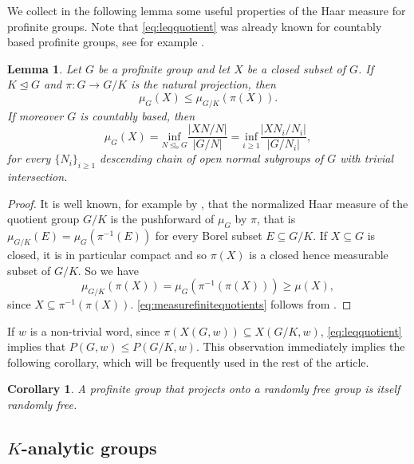 \documentclass[a4paper,10pt]{amsart}
\theoremstyle{plain}
\newtheorem{corollary}[thm]{Corollary}
\newtheorem{lemma}[thm]{Lemma}
\theoremstyle{definition}
\numberwithin{equation}{section}
\begin{document}
We collect in the following lemma some useful properties of the Haar measure for profinite groups. Note that \cref{eq:leqquotient} was already known for countably based profinite groups, see for example \cite[Lemma 11.1.1]{LS03}.

\begin{lemma}\label{quotient}
	   	Let $G$ be a profinite group and let $X$ be a closed subset of $G$. If $K\unlhd G$ and $\pi\colon G\to G/K$ is the natural projection, then \begin{equation}\label{eq:leqquotient}
	   		\mu_G(X)\leq\mu_{G/K}(\pi(X)).
	   	\end{equation}
	   	 If moreover $G$ is countably based, then 
         \begin{equation}\label{eq:measurefinitequotients}
     	\mu_G(X)=\underset{N\unlhd_oG}{\mathrm{inf}}\frac{|XN/N|}{|G/N|}=\underset{i\geq 1}{\mathrm{inf}}\frac{|XN_i/N_i|}{|G/N_i|},
     \end{equation}
     for every $\{N_i\}_{i\geq 1}$ descending chain of open normal subgroups of $G$ with trivial intersection.
\end{lemma}
\begin{proof}
	It is well known, for example by \cite[Section 63, Theorem C]{H50}, that the normalized Haar measure of the quotient group $G/K$ is the pushforward of $\mu_G$ by $\pi$, that is $\mu_{G/K}(E)=\mu_G(\pi^{-1}(E))$ for every Borel subset $E\subseteq G/K$. If $X\subseteq G$ is closed, it is in particular compact and so $\pi(X)$ is a closed hence measurable subset of $G/K$. So we have
	\[\mu_{G/K}(\pi(X)) = \mu_G(\pi^{-1}(\pi(X))) \geq \mu(X),\]
	since $X \subseteq \pi^{-1}(\pi(X))$. \cref{eq:measurefinitequotients} follows from \cite[p.~206]{LS03}.
\end{proof}
If $w$ is a non-trivial word, since $\pi (X(G,w))\subseteq X(G/K,w)$, \cref{eq:leqquotient} implies that $P(G,w)\leq P(G/K,w)$. This observation immediately implies the following corollary, which will be frequently used in the rest of the article. 

\begin{corollary}\label{cor:quot_rand_free}
A profinite group that projects onto a randomly free group is itself randomly free.     
\end{corollary}



\subsection{\texorpdfstring{$K$}{K}-analytic groups}
\end{document}
